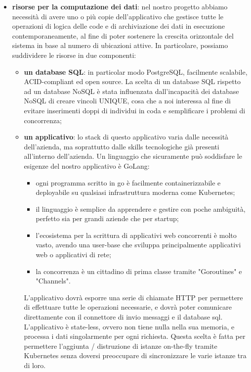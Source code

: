 \documentclass[a4paper, titlepage, 12pt, openright, twoside]{book}
\begin{document}
\begin{itemize}
	\item \textbf{risorse per la computazione dei dati}: nel nostro progetto abbiamo necessità di avere uno o più copie dell'applicativo che gestisce tutte le operazioni
				 di logica delle code e di archiviazione dei dati in esecuzione contemporaneamente, al fine di poter sostenere la crescita orizzontale del sistema in base al numero di ubicazioni attive. In particolare, possiamo suddividere le risorse in due componenti:
				 \begin{itemize}
				 	\item \textbf{un database SQL}: in particolar modo PostgreSQL, facilmente scalabile, ACID-compliant ed open source. La scelta di un database SQL rispetto ad
				 				 un database NoSQL è stata influenzata dall'incapacità dei database NoSQL di creare vincoli UNIQUE, cosa che a noi interessa
				 				 al fine di evitare inserimenti doppi di individui in coda e semplificare i problemi di concorrenza;
				 	\item \textbf{un applicativo}: lo stack di questo applicativo varia dalle necessità dell'azienda, ma soprattutto dalle skills tecnologiche già presenti
				 				 all'interno dell'azienda. Un linguaggio che sicuramente può soddisfare le esigenze del nostro applicativo è GoLang:
				 				 \begin{itemize}
				 				 	\item ogni programma scritto in go è facilmente containerizzabile e deployabile su qualsiasi infrastruttura moderna come Kubernetes;
				 				 	\item il linguaggio è semplice da apprendere e gestire con poche ambiguità, perfetto sia per grandi aziende che per startup;
				 				 	\item l'ecosistema per la scrittura di applicativi web concorrenti è molto vasto, avendo una user-base che sviluppa principalmente 
				 				 		  applicativi web o applicativi di rete;
				 				 	\item la concorrenza è un cittadino di prima classe tramite "Goroutines" e "Channels".
				 				 \end{itemize}
				 				 L'applicativo dovrà esporre una serie di chiamate HTTP per permettere di effettuare tutte le operazioni necessarie,
				 				 e dovrà poter comunicare direttamente con il connettore di invio messaggi e il database sql. L'applicativo è state-less, ovvero non tiene nulla nella sua memoria, e processa i dati singolarmente per ogni richiesta. Questa scelta è fatta per permettere l'aggiunta / distruzione di istanze on-the-fly tramite
				 				 Kubernetes senza doversi preoccupare di sincronizzare le varie istanze tra di loro.
				 \end{itemize}
	

\end{itemize}
\end{document}
